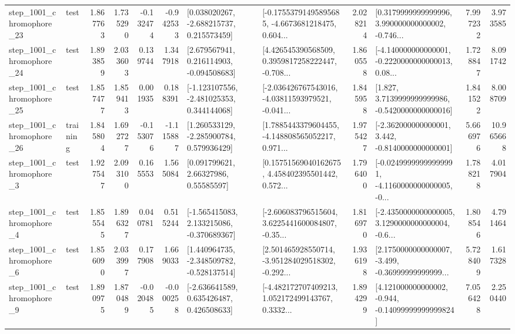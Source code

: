\begin{tabular}{llrrrrllrlrr}
 step\_1001\_chromophore\_23 &      test &      1.867763 &    1.735290 &     -0.132474 & -0.942533 &    [0.038020267, -2.688215737, 0.215573459] &  [-0.17553791495895685, -4.6673681218475, 0.604... &       2.028214 &  [0.3179999999999996, 3.990000000000002, -0.746... &            7.997232 &          3.973585 \\
 step\_1001\_chromophore\_24 &      test &      1.893859 &    2.033603 &      0.139744 &  1.347918 &    [2.679567941, 0.216114903, -0.094508683] &  [4.426545390568509, 0.3959817258222447, -0.708... &       1.860558 &  [-4.140000000000001, -0.2220000000000013, 0.08... &            1.728847 &          8.091742 \\
 step\_1001\_chromophore\_25 &      test &      1.857477 &    1.859413 &      0.001935 &  0.188391 &   [-1.123107556, -2.481025353, 0.344144068] &  [-2.036426767543016, -4.03811593979521, -0.041... &       1.845958 &   [1.827, 3.7139999999999986, -0.5420000000000016] &            1.841522 &          8.008709 \\
 step\_1001\_chromophore\_26 &  training &      1.845804 &    1.692727 &     -0.153076 & -1.115887 &    [1.260533129, -2.285900784, 0.579936429] &  [1.7885443379604455, -4.148808565052217, 0.971... &       1.975427 &   [-2.362000000000001, 3.442, -0.8140000000000001] &            5.666976 &         10.965668 \\
  step\_1001\_chromophore\_3 &      test &      1.927547 &    2.093100 &      0.165553 &  1.565084 &       [0.091799621, 2.66327986, 0.55585597] &  [0.15751569040162675, 4.458402395501442, 0.572... &       1.796400 &  [-0.02499999999999991, -4.1160000000000005, -0... &            1.788218 &          4.017904 \\
  step\_1001\_chromophore\_4 &      test &      1.855545 &    1.896327 &      0.040781 &  0.515244 &   [-1.565415083, 2.133215086, -0.370689367] &  [-2.606083796515604, 3.6225441600084807, -0.35... &       1.816970 &  [-2.4350000000000005, 3.1290000000000004, -0.6... &            1.808546 &          4.791464 \\
  step\_1001\_chromophore\_6 &      test &      1.856090 &    2.033997 &      0.177908 &  1.669033 &   [1.440964735, -2.348509782, -0.528137514] &  [2.501465928550714, -3.951284029518302, -0.292... &       1.936198 &  [2.1750000000000007, -3.499, -0.36999999999999... &            5.728409 &          1.617328 \\
  step\_1001\_chromophore\_9 &      test &      1.890975 &    1.870489 &     -0.020485 & -0.000258 &    [-2.636641589, 0.635426487, 0.426508633] &  [-4.482172707409213, 1.052172499143767, 0.3332... &       1.894299 &  [4.121000000000002, -0.944, -0.14099999999999824] &            7.056428 &          2.250440 \\

\end{tabular}
